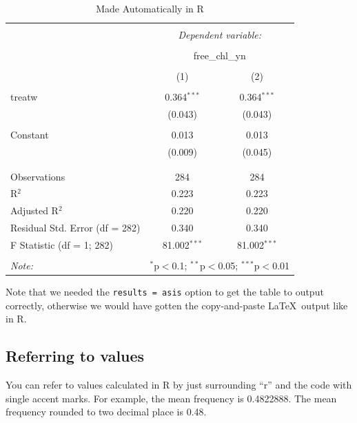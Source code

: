 \documentclass[11pt,]{article}
\begin{document}
\begin{table}[!htbp] \centering 
  \caption{Made Automatically in R} 
  \label{} 
\begin{tabular}{@{\extracolsep{5pt}}lcc} 
\\[-1.8ex]\hline 
\hline \\[-1.8ex] 
 & \multicolumn{2}{c}{\textit{Dependent variable:}} \\ 
\cline{2-3} 
\\[-1.8ex] & \multicolumn{2}{c}{free\_chl\_yn} \\ 
\\[-1.8ex] & (1) & (2)\\ 
\hline \\[-1.8ex] 
 treatw & 0.364$^{***}$ & 0.364$^{***}$ \\ 
  & (0.043) & (0.043) \\ 
  & & \\ 
 Constant & 0.013 & 0.013 \\ 
  & (0.009) & (0.045) \\ 
  & & \\ 
\hline \\[-1.8ex] 
Observations & 284 & 284 \\ 
R$^{2}$ & 0.223 & 0.223 \\ 
Adjusted R$^{2}$ & 0.220 & 0.220 \\ 
Residual Std. Error (df = 282) & 0.340 & 0.340 \\ 
F Statistic (df = 1; 282) & 81.002$^{***}$ & 81.002$^{***}$ \\ 
\hline 
\hline \\[-1.8ex] 
\textit{Note:}  & \multicolumn{2}{r}{$^{*}$p$<$0.1; $^{**}$p$<$0.05; $^{***}$p$<$0.01} \\ 
\end{tabular} 
\end{table}

Note that we needed the
\texttt{results\ =\ \textquotesingle{}asis\textquotesingle{}} option to
get the table to output correctly, otherwise we would have gotten the
copy-and-paste \LaTeX~output like in R.

\hypertarget{referring-to-values}{%
\subsection{Referring to values}\label{referring-to-values}}

You can refer to values calculated in R by just surrounding ``r'' and
the code with single accent marks. For example, the mean frequency is
0.4822888. The mean frequency rounded to two decimal place is 0.48.
\end{document}
